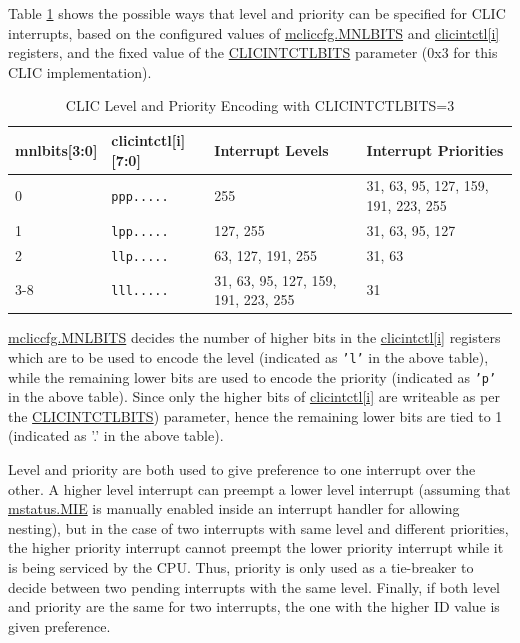 \documentclass[main\_\_EN.tex]{subfiles}
\begin{document}
Table \ref{tab:riscv-clic-level-priority} shows the possible ways that level and priority can be specified for CLIC interrupts, based on the configured values of \hyperref[fielddesc:MCLICCFG_MNLBITS]{mcliccfg.MNLBITS}
and \hyperref[regdesc:MCLICINTCTL_REG_i]{clicintctl[i]} registers, and the fixed value of the \hyperref[fielddesc:CLICINFO_CLICINTCTLBITS]{CLICINTCTLBITS} parameter (0x3 for this CLIC implementation).

\begin{longtable}{ | l | l | l | l | }
\caption{CLIC Level and Priority Encoding with CLICINTCTLBITS=3}
\label{tab:riscv-clic-level-priority}
\\\hline
\rowcolor{lightgray}
mnlbits[3:0] & clicintctl[i][7:0] & Interrupt Levels & Interrupt Priorities \\ \hline
0   & \texttt{ppp.....} & 255 & 31, 63, 95, 127, 159, 191, 223, 255 \\ \hline
1   & \texttt{lpp.....} & 127, 255 & 31, 63, 95, 127 \\ \hline
2   & \texttt{llp.....} & 63, 127, 191, 255 & 31, 63 \\ \hline
3-8 & \texttt{lll.....} & 31, 63, 95, 127, 159, 191, 223, 255 & 31 \\ \hline
\end{longtable}

\hyperref[fielddesc:MCLICCFG_MNLBITS]{mcliccfg.MNLBITS} decides the number of higher bits in the \hyperref[regdesc:MCLICINTCTL_REG_i]{clicintctl[i]} registers which are to be used to encode the level (indicated as \texttt{'l'} in the above table), while the remaining lower bits are used to encode the priority (indicated as \texttt{'p'} in the above table). Since only the higher bits of \hyperref[regdesc:MCLICINTCTL_REG_i]{clicintctl[i]} are writeable as per the \hyperref[fielddesc:CLICINFO_CLICINTCTLBITS]{CLICINTCTLBITS}) parameter, hence the remaining lower bits are tied to 1 (indicated as '.' in the above table).

Level and priority are both used to give preference to one interrupt over the other. A higher level interrupt can preempt a lower level interrupt (assuming that \hyperref[fielddesc:MSTATUSMIE]{mstatus.MIE} is manually enabled inside an interrupt handler for allowing nesting), but in the case of two interrupts with same level and different priorities, the higher priority interrupt cannot preempt the lower priority interrupt while it is being serviced by the CPU. Thus, priority is only used as a tie-breaker to decide between two pending interrupts with the same level. Finally, if both level and priority are the same for two interrupts, the one with the higher ID value is given preference.
\end{document}
